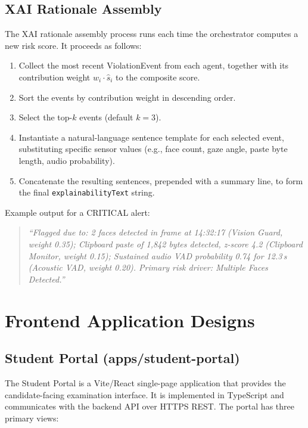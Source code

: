 \subsection{XAI Rationale Assembly}

The XAI rationale assembly process runs each time the orchestrator computes a new risk score. It proceeds as follows:

\begin{enumerate}
    \item Collect the most recent ViolationEvent from each agent, together with its contribution weight $w_i \cdot \hat{s}_i$ to the composite score.
    \item Sort the events by contribution weight in descending order.
    \item Select the top-$k$ events (default $k=3$).
    \item Instantiate a natural-language sentence template for each selected event, substituting specific sensor values (e.g., face count, gaze angle, paste byte length, audio probability).
    \item Concatenate the resulting sentences, prepended with a summary line, to form the final \texttt{explainabilityText} string.
\end{enumerate}

Example output for a CRITICAL alert:

\begin{quote}
    \textit{``Flagged due to: 2 faces detected in frame at 14:32:17 (Vision Guard, weight 0.35); Clipboard paste of 1,842 bytes detected, z-score 4.2 (Clipboard Monitor, weight 0.15); Sustained audio VAD probability 0.74 for 12.3\,s (Acoustic VAD, weight 0.20). Primary risk driver: Multiple Faces Detected.''}
\end{quote}

\section{Frontend Application Designs}

\subsection{Student Portal (apps/student-portal)}

The Student Portal is a Vite/React single-page application that provides the candidate-facing examination interface. It is implemented in TypeScript and communicates with the backend API over HTTPS REST. The portal has three primary views:

